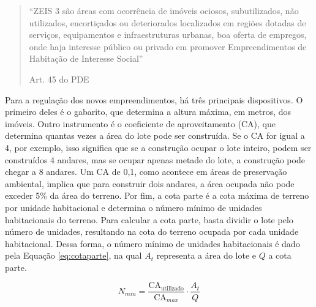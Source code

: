 \begin{quotation}
    ``ZEIS 3 são áreas com ocorrência de imóveis ociosos, subutilizados, não utilizados, encortiçados ou deteriorados localizados em regiões dotadas de serviços, equipamentos e infraestruturas urbanas, boa oferta de empregos, onde haja interesse público ou privado em promover Empreendimentos de Habitação de Interesse Social''

    \raggedleft Art. 45 do PDE \cite{PDE}
\end{quotation}

Para a regulação dos novos empreendimentos, há três principais dispositivos. O primeiro deles é o gabarito, que determina a altura máxima, em metros, dos imóveis. Outro instrumento é o coeficiente de aproveitamento (CA), que determina quantas vezes a área do lote pode ser construída. Se o CA for igual a 4, por exemplo, isso significa que se a construção ocupar o lote inteiro, podem ser construídos 4 andares, mas se ocupar apenas metade do lote, a construção pode chegar a 8 andares. Um CA de 0,1, como acontece em áreas de preservação ambiental, implica que para construir dois andares, a área ocupada não pode exceder 5\% da área do terreno. Por fim, a cota parte é a cota máxima de terreno por unidade habitacional e determina o número mínimo de unidades habitacionais do terreno. Para calcular a cota parte, basta dividir o lote pelo número de unidades, resultando na cota do terreno ocupada por cada unidade habitacional. Dessa forma, o número mínimo de unidades habitacionais é dado pela Equação \ref{eq:cotaparte}, na qual $A_t$ representa a área do lote e $Q$ a cota parte.

\begin{equation}
    N_{min} = \frac{\text{CA}_{\text{utilizado}}}{\text{CA}_{max}}\cdot \frac{A_t}{Q}
    \label{eq:cotaparte}
\end{equation}

